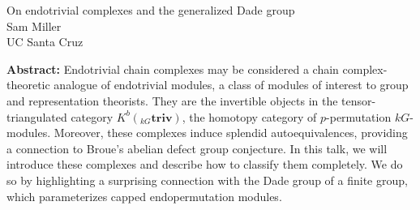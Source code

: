 \documentclass[12pt,a4paper]{article}
\begin{document}
\thispagestyle{empty} 
\begin{center}
{\large  On endotrivial complexes and the generalized Dade group}\\
\vspace*{.5cm}
Sam Miller\\
UC Santa Cruz\\
\end{center}
\vspace*{.8cm}

{\bf Abstract:} Endotrivial chain complexes may be considered a chain complex-theoretic analogue of endotrivial modules, a class of modules of interest to group and representation theorists. They are the invertible objects in the tensor-triangulated category $K^b({}_{kG}\mathbf{triv})$, the homotopy category of $p$-permutation $kG$-modules. Moreover, these complexes induce splendid autoequivalences, providing a connection to Broue's abelian defect group conjecture. In this talk, we will introduce these complexes and describe how to classify them completely. We do so by highlighting a surprising connection with the Dade group of a finite group, which parameterizes capped endopermutation modules.  
\end{document}
